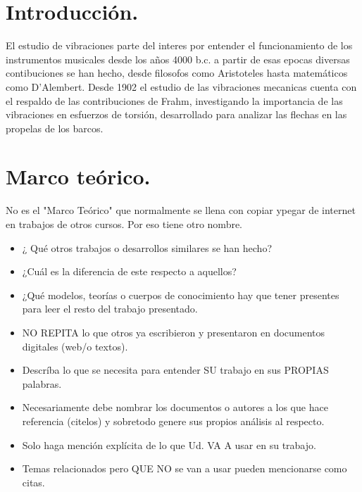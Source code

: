 \documentclass[10pt]{article}
\begin{document}
\section{Introducción.} 

El estudio de vibraciones parte del interes por entender el funcionamiento de los instrumentos musicales desde los años 4000  b.c. \cite{IEEEreferencias:Ref1} a partir de esas epocas diversas contibuciones se han hecho, desde filosofos como Aristoteles hasta matemáticos como D'Alembert. Desde 1902 el estudio de las vibraciones mecanicas cuenta con el respaldo de las contribuciones de Frahm, investigando la importancia de las vibraciones en esfuerzos de torsión, desarrollado para analizar las flechas en las propelas de los barcos. \cite{IEEEReferencias:Ref2}



\section{Marco teórico.}


No es el "Marco Teórico" que normalmente se llena con copiar ypegar de internet en trabajos de otros cursos. Por eso tiene otro nombre.

\begin{itemize}
\item  ¿ Qué otros trabajos o desarrollos similares se han hecho?
\item  ¿Cuál es la diferencia de este respecto a aquellos?
\item  ¿Qué modelos, teorías o cuerpos de conocimiento hay que tener presentes para leer el resto del trabajo presentado.
\item NO REPITA lo que otros ya escribieron y presentaron en documentos digitales (web/o textos). 

\item Descríba lo que se necesita para entender SU trabajo en sus PROPIAS palabras.
\item Necesariamente debe nombrar los documentos o autores a los que hace referencia (citelos) y sobretodo genere sus propios análisis al respecto.
\item Solo haga mención explícita de lo que Ud. VA A usar en su trabajo. 
\item Temas relacionados pero QUE NO se van a usar pueden mencionarse como citas.
\end{itemize}
\end{document}
